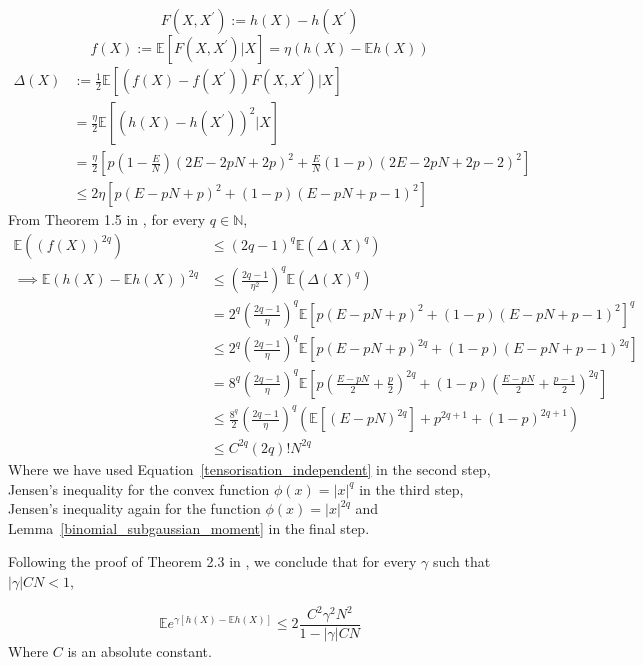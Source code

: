 \documentclass[final,12pt]{colt2018}
\begin{document}
$$F(X,X^{\prime}) := h(X) - h(X^{\prime})$$
$$f(X) := \mathbb{E}\left[F(X,X^{\prime})|X\right] = \eta (h(X) - \mathbb{E}h(X))$$
\begin{align}
\Delta(X) &:= \frac{1}{2}\mathbb{E}\left[(f(X) -f(X^{\prime}))F(X,X^{\prime})|X\right]\nonumber \\ 
&= \frac{\eta}{2}\mathbb{E}\left[\left(h(X)-h(X^{\prime})\right)^2|X\right]\nonumber \\
&= \frac{\eta}{2}\left[  p\left(1-\tfrac{E}{N}\right)(2E-2pN+2p)^2 + \tfrac{E}{N}(1-p)(2E-2pN+2p-2)^2\right] \nonumber\\
&\leq 2\eta \left[p(E-pN+p)^2 + (1-p)(E-pN+p-1)^2 \right] 
\label{tensorisation_independent}
\end{align}
From Theorem 1.5 in \citet{chatterjee2007stein}, for every $q \in \mathbb{N}$,
\begin{align}
\mathbb{E}((f(X))^{2q}) &\leq (2q-1)^q \mathbb{E}(\Delta(X)^q) \nonumber \\
\implies\mathbb{E} (h(X)-\mathbb{E}h(X))^{2q} &\leq \left(\frac{2q-1}{\eta^2}\right)^{q} \mathbb{E}(\Delta(X)^q)\nonumber \\
&= 2^q\left(\frac{2q-1}{\eta}\right)^{q} \mathbb{E}\left[p(E-pN+p)^2 + (1-p)(E-pN+p-1)^2\right]^q\nonumber \\
&\leq  2^q\left(\frac{2q-1}{\eta}\right)^{q} \mathbb{E}\left[p(E-pN+p)^{2q} + (1-p)(E-pN+p-1)^{2q}\right]\nonumber \\
&= 8^q\left(\frac{2q-1}{\eta}\right)^{q} \mathbb{E}\left[p\left(\tfrac{E-pN}{2}+\tfrac{p}{2}\right)^{2q} + (1-p)\left(\tfrac{E-pN}{2}+\tfrac{p-1}{2}\right)^{2q}\right]\nonumber \\
&\leq \frac{8^q}{2}\left(\frac{2q-1}{\eta}\right)^{q} \left(\mathbb{E} \left[(E-pN)^{2q}\right] + p^{2q+1} + (1-p)^{2q+1}\right)\nonumber \\
&\leq C^{2q} (2q)! N^{2q}
\end{align}
Where we have used Equation~\eqref{tensorisation_independent} in the second step, Jensen's inequality for the convex function $\phi(x) = |x|^q$ in the third step, Jensen's inequality again for the function $\phi(x) = |x|^{2q}$ and Lemma~\ref{binomial_subgaussian_moment} in the final step.

Following the proof of Theorem 2.3 in \citet{boucheron2013concentration}, we conclude that for every $\gamma$ such that $ |\gamma| C N < 1 $, 

\begin{equation}
\mathbb{E}e^{\gamma\left[h(X)-\mathbb{E}h(X)\right]} \leq 2 \frac{C^2 \gamma^2 N^2}{1-|\gamma|CN}
\label{super_concentration}
\end{equation}
Where $C$ is an absolute constant.
\end{document}
